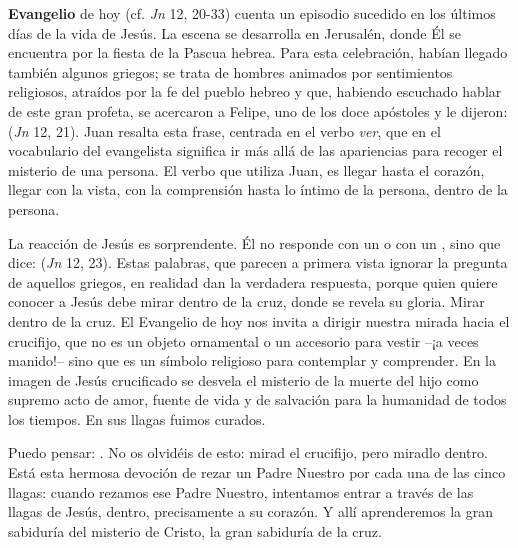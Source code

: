 \begin{body}
 \textbf{Evangelio} de hoy (cf. \textit{Jn} 12, 20-33) cuenta un episodio sucedido en los últimos días de la vida de Jesús. La escena se desarrolla en Jerusalén, donde Él se encuentra por la fiesta de la Pascua hebrea. Para esta celebración, habían llegado también algunos griegos; se trata de hombres animados por sentimientos religiosos, atraídos por la fe del pueblo hebreo y que, habiendo escuchado hablar de este gran profeta, se acercaron a Felipe, uno de los doce apóstoles y le dijeron:  (\textit{Jn} 12, 21). Juan resalta esta frase, centrada en el verbo \textit{ver}, que en el vocabulario del evangelista significa ir más allá de las apariencias para recoger el misterio de una persona. El verbo que utiliza Juan,  es llegar hasta el corazón, llegar con la vista, con la comprensión hasta lo íntimo de la persona, dentro de la persona.

La reacción de Jesús es sorprendente. Él no responde con un  o con un , sino que dice:  (\textit{Jn} 12, 23). Estas palabras, que parecen a primera vista ignorar la pregunta de aquellos griegos, en realidad dan la verdadera respuesta, porque quien quiere conocer a Jesús debe mirar dentro de la cruz, donde se revela su gloria. Mirar dentro de la cruz. El Evangelio de hoy nos invita a dirigir nuestra mirada hacia el crucifijo, que no es un objeto ornamental o un accesorio para vestir –¡a veces manido!– sino que es un símbolo religioso para contemplar y comprender. En la imagen de Jesús crucificado se desvela el misterio de la muerte del hijo como supremo acto de amor, fuente de vida y de salvación para la humanidad de todos los tiempos. En sus llagas fuimos curados.

Puedo pensar: . No os olvidéis de esto: mirad el crucifijo, pero miradlo dentro. Está esta hermosa devoción de rezar un Padre Nuestro por cada una de las cinco llagas: cuando rezamos ese Padre Nuestro, intentamos entrar a través de las llagas de Jesús, dentro, precisamente a su corazón. Y allí aprenderemos la gran sabiduría del misterio de Cristo, la gran sabiduría de la cruz.


\end{body}
